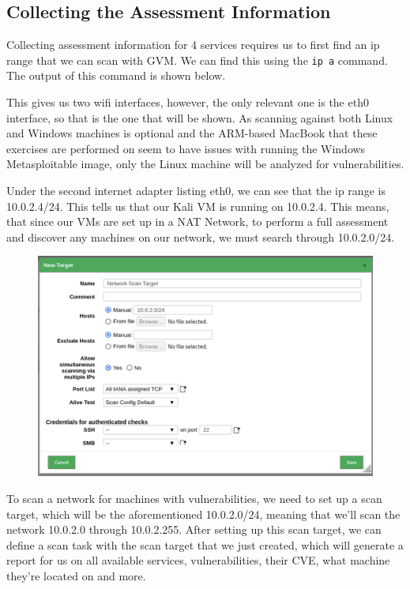 \subsection{Collecting the Assessment Information}
Collecting assessment information for 4 services requires us to first find an ip range that we can scan with GVM. We can find this using the \texttt{ip a} command. The output of this command is shown below.

This gives us two wifi interfaces, however, the only relevant one is the eth0 interface, so that is the one that will be shown. As scanning against both Linux and Windows machines is optional and the ARM-based MacBook that these exercises are performed on seem to have issues with running the Windows Metasploitable image, only the Linux machine will be analyzed for vulnerabilities.


Under the second internet adapter listing eth0, we can see that the ip range is 10.0.2.4/24. This tells us that our Kali VM is running on 10.0.2.4. This means, that since our VMs are set up in a NAT Network, to perform a full assessment and discover any machines on our network, we must search through 10.0.2.0/24.

\begin{figure}[H]
    \begin{center}
        \includegraphics[width=\textwidth]{Outputs/E03/gvm-scan-target.png}
    \end{center}
\end{figure}

To scan a network for machines with vulnerabilities, we need to set up a scan target, which will be the aforementioned 10.0.2.0/24, meaning that we'll scan the network 10.0.2.0 through 10.0.2.255. After setting up this scan target, we can define a scan task with the scan target that we just created, which will generate a report for us on all available services, vulnerabilities, their CVE, what machine they're located on and more.

